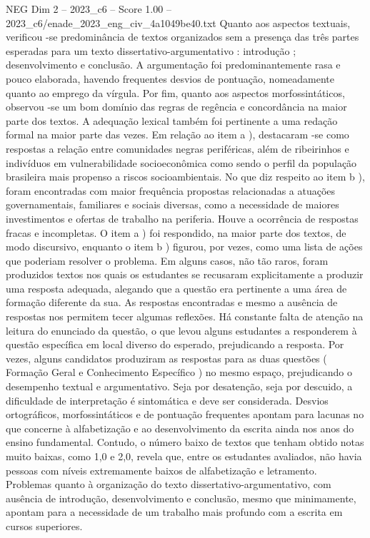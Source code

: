 \begin{textsample}{NEG Dim 2 – 2023\_c6 – Score 1.00 – 2023\_c6/enade\_2023\_eng\_civ\_4a1049be40.txt}
Quanto aos aspectos textuais, verificou -se predominância de textos organizados sem a presença das três partes esperadas para um texto dissertativo-argumentativo : introdução ; desenvolvimento e conclusão.
A argumentação foi predominantemente rasa e pouco elaborada, havendo frequentes desvios de pontuação, nomeadamente quanto ao emprego da vírgula.
Por fim, quanto aos aspectos morfossintáticos, observou -se um bom domínio das regras de regência e concordância na maior parte dos textos.
A adequação lexical também foi pertinente a uma redação formal na maior parte das vezes.
Em relação ao item a ), destacaram -se como respostas a relação entre comunidades negras periféricas, além de ribeirinhos e indivíduos em vulnerabilidade socioeconômica como sendo o perfil da população brasileira mais propenso a riscos socioambientais.
No que diz respeito ao item b ), foram encontradas com maior frequência propostas relacionadas a atuações governamentais, familiares e sociais diversas, como a necessidade de maiores investimentos e ofertas de trabalho na periferia.
Houve a ocorrência de respostas fracas e incompletas.
O item a ) foi respondido, na maior parte dos textos, de modo discursivo, enquanto o item b ) figurou, por vezes, como uma lista de ações que poderiam resolver o problema.
Em alguns casos, não tão raros, foram produzidos textos nos quais os estudantes se recusaram explicitamente a produzir uma resposta adequada, alegando que a questão era pertinente a uma área de formação diferente da sua.
As respostas encontradas e mesmo a ausência de respostas nos permitem tecer algumas reflexões.
Há constante falta de atenção na leitura do enunciado da questão, o que levou alguns estudantes a responderem à questão específica em local diverso do esperado, prejudicando a resposta.
Por vezes, alguns candidatos produziram as respostas para as duas questões ( Formação Geral e Conhecimento Específico ) no mesmo espaço, prejudicando o desempenho textual e argumentativo.
Seja por desatenção, seja por descuido, a dificuldade de interpretação é sintomática e deve ser considerada.
Desvios ortográficos, morfossintáticos e de pontuação frequentes apontam para lacunas no que concerne à alfabetização e ao desenvolvimento da escrita ainda nos anos do ensino fundamental.
Contudo, o número baixo de textos que tenham obtido notas muito baixas, como 1,0 e 2,0, revela que, entre os estudantes avaliados, não havia pessoas com níveis extremamente baixos de alfabetização e letramento.
Problemas quanto à organização do texto dissertativo-argumentativo, com ausência de introdução, desenvolvimento e conclusão, mesmo que minimamente, apontam para a necessidade de um trabalho mais profundo com a escrita em cursos superiores.

\end{textsample}

